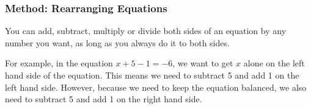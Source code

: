             \subsubsection{ Method: Rearranging Equations}
            \nopagebreak
            
        
        \label{m39250*id144329}You can add, subtract, multiply or divide both sides of an equation by any number you want, as long as you always do it to both sides.\par 
        \label{m39250*id144333}For example, in the equation \begin{math}x+5-1=-6\end{math}\hspace{1ex}, we want to get \begin{math}x\end{math} alone on the left hand side of the equation. This means we need to subtract 5 and add 1 on the left hand side. However, because we need to keep the equation balanced, we also need to subtract 5 and add 1 on the right hand side.\par 
        \label{m39250*id144370}\nopagebreak\noindent{}
    
